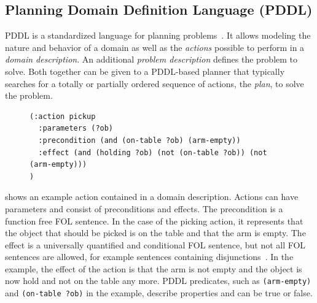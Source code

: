 \subsection{Planning Domain Definition Language (PDDL)}
PDDL is a standardized language for planning
problems~\cite{PDDL}. It allows modeling the nature and behavior of a
domain as well as the \emph{actions} possible to perform in a
\emph{domain description}. An additional \emph{problem description}
defines the problem to solve. Both together can be given to a PDDL-based
planner that typically searches for a totally or partially ordered
sequence of actions, the \emph{plan}, to solve the problem.
\begin{figure}
\begin{lstlisting}[showlines,style=ReallySmallCLIPS, caption={PDDL
      action to pick up an object from a table},
  label=lsf:pddl-action,
  emph={skill, args, state, target, res},
  emphstyle=\bfseries\color{green!80!black},
  emph={[2]\?skill, \$\?args, wait-for-lock, \?target, use,
  WAIT-FOR-LOCK, SKILL-EXECUTION, running},
  emphstyle={[2]\bfseries\color{blue!80!black}},
  morekeywords={action, parameters, precondition, effect}]
(:action pickup
  :parameters (?ob)
  :precondition (and (on-table ?ob) (arm-empty))
  :effect (and (holding ?ob) (not (on-table ?ob)) (not (arm-empty)))
)
\end{lstlisting}
\end{figure}
 shows an example action contained in a domain
description.  Actions can have parameters and consist of preconditions
and effects. The precondition is a function free FOL sentence. In the
case of the picking action, it represents that the object that
should be picked is on the table and that the arm is empty. The effect
is a universally quantified and conditional FOL sentence, but not all FOL
sentences are allowed, for example sentences containing disjunctions~\cite{PDDL}. In the
example, the effect of the action is that the arm is not empty and the
object is now hold and not on the table any more. PDDL predicates,
such as \texttt{(arm-empty)} and \texttt{(on-table ?ob)} in the example,
describe properties and can be true or false.

